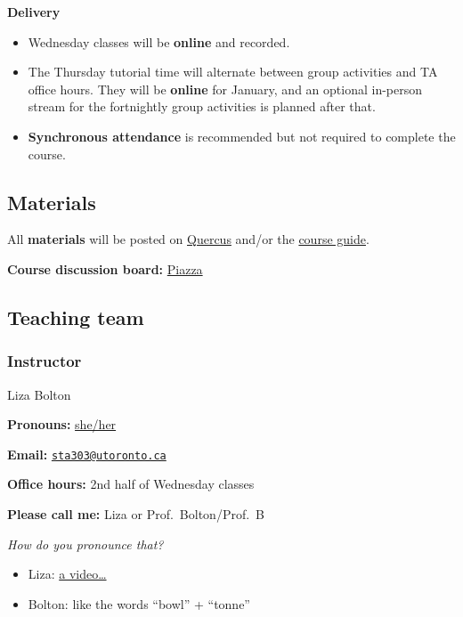 \documentclass[
  openany]{book}
\begin{document}
\textbf{Delivery}

\begin{itemize}
\item
  Wednesday classes will be \textbf{online} and recorded.
\item
  The Thursday tutorial time will alternate between group activities and TA office hours. They will be \textbf{online} for January, and an optional in-person stream for the fortnightly group activities is planned after that.
\item
  \textbf{Synchronous attendance} is recommended but not required to complete the course.
\end{itemize}

\hypertarget{materials}{%
\subsection{Materials}\label{materials}}

All \textbf{materials} will be posted on \href{https://q.utoronto.ca/courses/253305}{Quercus} and/or the \href{https://sta303-bolton.github.io/sta303-w22-courseguide/}{course guide}.

\textbf{Course discussion board:} \href{http://piazza.com/utoronto.ca/winter2022/sta303sta1002/home}{Piazza}

\hypertarget{teaching-team}{%
\subsection{Teaching team}\label{teaching-team}}

\hypertarget{instructor}{%
\subsubsection{\texorpdfstring{\textbf{Instructor}}{Instructor}}\label{instructor}}

Liza Bolton

\textbf{Pronouns:} \href{https://www.mypronouns.org/she-her}{she/her}

\textbf{Email:} \href{mailto:sta303@utoronto.ca}{\nolinkurl{sta303@utoronto.ca}}

\textbf{Office hours:} 2nd half of Wednesday classes

\textbf{Please call me:} Liza or Prof.~Bolton/Prof.~B

\emph{How do you pronounce that?}

\begin{itemize}
\item
  Liza: \href{https://www.youtube.com/watch?v=hWURas7fYwk}{a video\ldots{}}
\item
  Bolton: like the words ``bowl'' + ``tonne''
\end{itemize}
\end{document}
